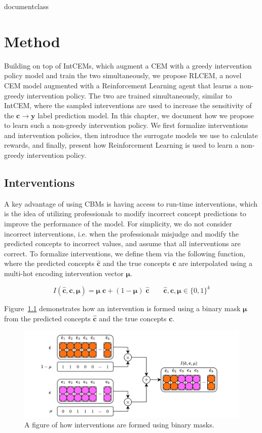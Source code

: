 \csname documentclass

\chapter{Method}
Building on top of IntCEMs, which augment a CEM
with a greedy intervention policy model and train the two simultaneously,
we propose RLCEM,
a novel CEM model augmented with a Reinforcement Learning agent
that learns a non-greedy intervention policy.
The two are trained simultaneously, similar to IntCEM, 
where the sampled interventions are used to increase the sensitivity of the
$\mathbf{c} \to \mathbf{y}$ label prediction model.
In this chapter, we document how we propose 
to learn such a non-greedy intervention policy.
We first
formalize interventions and intervention policies,
then introduce the surrogate models we use
to calculate rewards,
and finally, present how Reinforcement Learning is used 
to learn a non-greedy intervention policy.
\section{Interventions}
A key advantage of using CBMs is having access to 
run-time interventions, which is the idea of utilizing professionals
to modify incorrect concept predictions to improve the 
performance of the model.
For simplicity, we do not consider incorrect interventions, 
i.e. when the professionals misjudge and modify
 the predicted concepts to incorrect values,
and assume that
all interventions are correct. To formalize interventions, we define
them via the following function, where
the predicted concepts $\hat{\mathbf{c}}$ and the true concepts $\mathbf{c}$ are interpolated
using a multi-hot encoding intervention vector $\bm{\mu}$.

\[I(\hat{\mathbf{c}}, \mathbf{c}, \bm{\mu}) = 
\bm{\mu} \; \mathbf{c} + (1 - \bm{\mu}) \; \hat{\mathbf{c}} \qquad \hat{\mathbf{c}}, \mathbf{c}, \bm{\mu} \in \{0, 1\}^k\]

Figure~\ref{fig:interventions} demonstrates how an intervention
is formed using 
a binary mask $\bm{\mu}$ from the predicted concepts $\hat{\mathbf{c}}$ and the true concepts $\mathbf{c}$.

\begin{figure}[!h]
    \centering
    \includegraphics[width=\textwidth]{figs/method/interventions.png}
    \caption{A figure of how interventions are formed using binary masks.}
    \label{fig:interventions}
\end{figure}

